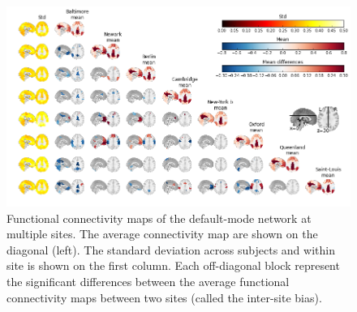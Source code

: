 \documentclass[authoryear]{elsarticle}
\begin{document}
\begin{figure}[H!]
\begin{center}
\includegraphics[width=\linewidth]{../figures/pccmap_multisite.png}
\end{center}
\caption[DMN variability across sites]{
Functional connectivity maps of the default-mode network at multiple sites. The average connectivity map are shown on the diagonal (left). The standard deviation across subjects and within site is shown on the first column. Each off-diagonal block represent the significant differences between the average functional connectivity maps between two sites (called the inter-site bias).
}
\label{fig_DMN_variability}
\end{figure}
\end{document}
